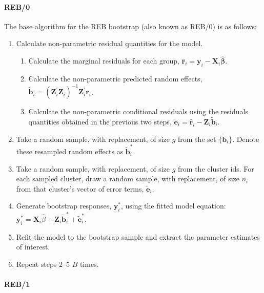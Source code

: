 \hypertarget{reb0}{%
\paragraph{REB/0}\label{reb0}}

The base algorithm for the REB bootstrap (also known as REB/0) is as follows:

\begin{enumerate}
\def\labelenumi{\arabic{enumi}.}
\tightlist
\item
  Calculate non-parametric residual quantities for the model.

  \begin{enumerate}
  \def\labelenumii{\alph{enumii}.}
  \tightlist
  \item
    Calculate the marginal residuals for each group, \(\widehat{\boldsymbol{r}}_i = \boldsymbol{y}_i - \boldsymbol{X}_i \widehat{\boldsymbol{\beta}}\).
  \item
    Calculate the non-parametric predicted random effects, \(\tilde{\boldsymbol{b}}_i = \left( \boldsymbol{Z}_i^\prime \boldsymbol{Z}_i \right)^{-1} \boldsymbol{Z}^\prime_i \boldsymbol{r}_i\).
  \item
    Calculate the non-parametric conditional residuals using the residuals quantities obtained in the previous two steps, \(\boldsymbol{\tilde{e}}_i = \widehat{\boldsymbol{r}}_i - \boldsymbol{Z}_i \boldsymbol{\tilde{b}}_i\).
  \end{enumerate}
\item
  Take a random sample, with replacement, of size \(g\) from the set \(\lbrace \tilde{\boldsymbol{b}}_i \rbrace\). Denote these resampled random effects as \(\boldsymbol{\tilde{b}}^*_i\).
\item
  Take a random sample, with replacement, of size \(g\) from the cluster ids. For each sampled cluster, draw a random sample, with replacement, of size \(n_i\) from that cluster's vector of error terms, \(\boldsymbol{\tilde{e}}_i\).
\item
  Generate bootstrap responses, \(\boldsymbol{y}^*_i\), using the fitted model equation: \(\boldsymbol{y}^*_i = \boldsymbol{X}_i \widehat{\beta} + \boldsymbol{Z}_i \boldsymbol{\tilde{b}}^*_i + \boldsymbol{\tilde{e}}^*_i\).
\item
  Refit the model to the bootstrap sample and extract the parameter estimates of interest.
\item
  Repeat steps 2--5 \(B\) times.
\end{enumerate}

\hypertarget{reb1}{%
\paragraph{REB/1}\label{reb1}}

